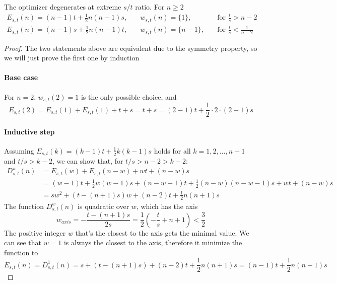 \documentclass[]{article}
\begin{document}
\vspace{1cm}
\begin{lemma}[Mode $M_0$] The optimizer degenerates at extreme $s/t$ ratio. For $n \geq2$
	\begin{align*}
	E_{s,t}(n) = (n-1)t + \frac{1}{2}n(n-1)s,\quad & w_{s,t}(n) = \{1\},\quad  &\text{for } \frac{t}{s} > n - 2 \\
	E_{s,t}(n) = (n-1)s + \frac{1}{2}n(n-1)t,\quad & w_{s,t}(n) = \{n-1\},\quad  &\text{for } \frac{t}{s} < \frac{1}{n-2}
	\end{align*}
\end{lemma}
\begin{proof}
	The two statements above are equivalent due to the symmetry property, so we will just prove the first one by induction
	\paragraph{Base case} For $n=2$, $w_{s,t}(2) = 1$ is the only possible choice, and
	\[
	E_{s,t}(2) = E_{s,t}(1) + E_{s,t}(1) + t + s = t + s = (2-1)t + \frac{1}{2}\cdot 2 \cdot (2-1) s
	\]
	\paragraph{Inductive step} Assuming $E_{s,t}(k) = (k-1)t + \frac{1}{2}k(k-1)s$ holds for all $k = 1,2,\dots, n-1$ and $t/s > k - 2$, we can show that, for $t/s > n - 2 > k - 2$:
	\begin{align*}
	D^w_{s,t}(n) &= E_{s,t}(w) + E_{s,t}(n-w)+wt+(n-w)s \\
	&=(w-1)t + \frac{1}{2}w(w-1)s + (n-w-1)t + \frac{1}{2}(n-w)(n-w-1)s+wt+(n-w)s\\
	&= sw^2 + (t-(n+1)s)w + (n-2)t + \frac{1}{2}n(n+1)s
	\end{align*}
	The function $D^w_{s,t}(n)$ is quadratic over $w$, which has the axis
	\[
		w_{axis} = -\frac{t-(n+1)s}{2s} = \frac{1}{2}\left(-\frac{t}{s} + n+1\right) < \frac{3}{2}
	\]
	The positive integer $w$ that's the closest to the axis gets the minimal value. We can see that $w=1$ is always the closest to the axis, therefore it minimize the function to
	\[
		E_{s,t}(n) = D^1_{s,t}(n) =s + (t-(n+1)s) + (n-2)t + \frac{1}{2}n(n+1)s = (n-1)t + \frac{1}{2}n(n-1)s
	\]
\end{proof}
\end{document}
